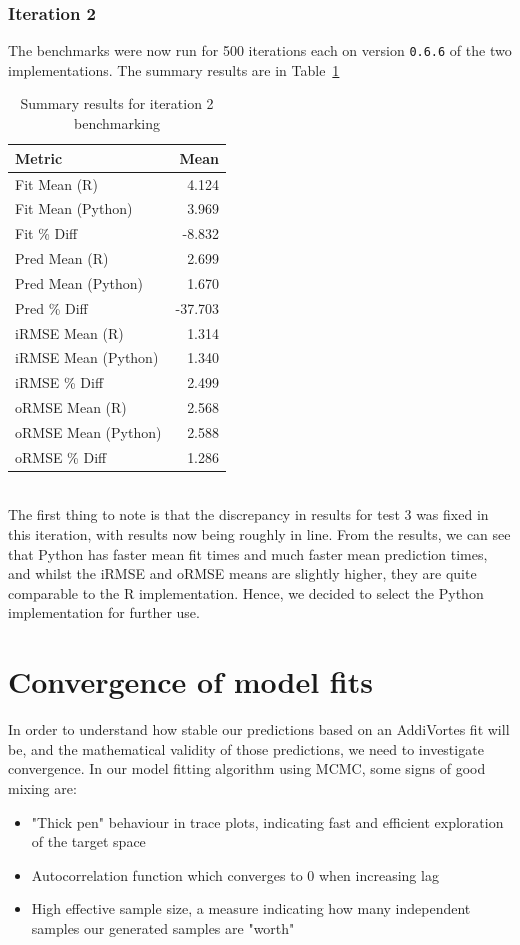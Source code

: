 \documentclass[10pt]{article}
\begin{document}
\subsubsection{Iteration 2}
The benchmarks were now run for 500 iterations each on version \texttt{0.6.6} of the two implementations. The summary results are in Table~\ref{tab:iter2}
\begin{table}[h]
\begin{center}
\begin{tabular}{|l|r|}
\hline
Metric & Mean\\
\hline\hline
Fit Mean (R) & 4.124\\
\hline
Fit Mean (Python) & 3.969\\
\hline
Fit \% Diff & -8.832\\
\hline\hline
Pred Mean (R) & 2.699\\
\hline
Pred Mean (Python) & 1.670\\
\hline
Pred \% Diff & -37.703\\
\hline\hline
iRMSE Mean (R) & 1.314\\
\hline
iRMSE Mean (Python) & 1.340\\
\hline
iRMSE \% Diff & 2.499\\
\hline\hline
oRMSE Mean (R) & 2.568\\
\hline
oRMSE Mean (Python) & 2.588\\
\hline
oRMSE \% Diff & 1.286\\
\hline
\end{tabular}
\caption{Summary results for iteration 2 benchmarking}
\label{tab:iter2}
\end{center}
\end{table}
\\
The first thing to note is that the discrepancy in results for test 3 was fixed in this iteration, with results now being roughly in line. From the results, we can see that Python has faster mean fit times and much faster mean prediction times, and whilst the iRMSE and oRMSE means are slightly higher, they are quite comparable to the R implementation. Hence, we decided to select the Python implementation for further use.
\section{Convergence of model fits}
In order to understand how stable our predictions based on an AddiVortes fit will be, and the mathematical validity of those predictions, we need to investigate convergence. In our model fitting algorithm using MCMC, some signs of good mixing are: \begin{itemize}
\item "Thick pen" behaviour in trace plots, indicating fast and efficient exploration of the target space
\item Autocorrelation function which converges to 0 when increasing lag
\item High effective sample size, a measure indicating how many independent samples our generated samples are "worth"
\end{itemize}
\end{document}
